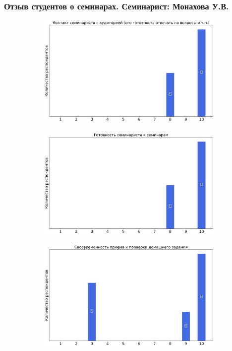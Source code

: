    \subsubsection{Отзыв студентов о семинарах. Семинарист: Монахова У.В.}
		\begin{figure}[H]
			\centering
			\begin{subfigure}[b]{0.45\textwidth}
				\centering
				\includegraphics[width=\textwidth]{images/2 course/Аналитическая механика/seminarists-marks-Монахова У.В.-0.png}
			\end{subfigure}
			\begin{subfigure}[b]{0.45\textwidth}
				\centering
				\includegraphics[width=\textwidth]{images/2 course/Аналитическая механика/seminarists-marks-Монахова У.В.-1.png}
			\end{subfigure}
			\begin{subfigure}[b]{0.45\textwidth}
				\centering
				\includegraphics[width=\textwidth]{images/2 course/Аналитическая механика/seminarists-marks-Монахова У.В.-2.png}

\end{subfigure}
\end{figure}
